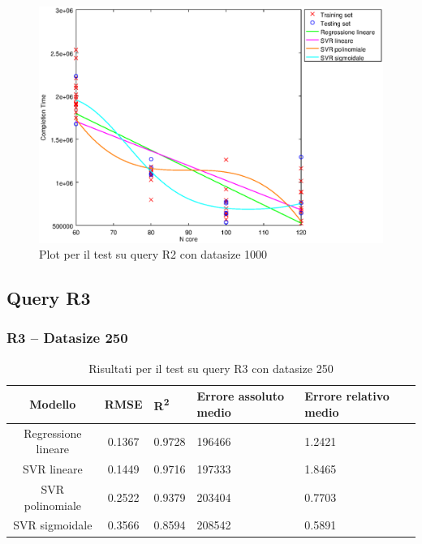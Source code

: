 \documentclass[a4paper,11pt]{article}
\begin{document}
\begin {figure}[hbtp]
\centering
\includegraphics[width=\textwidth]{output/R2_1000/plot_R2_1000.eps}
\caption {Plot per il test su query R2 con datasize 1000}
\end {figure}

\newpage
\subsection{Query R3}

\subsubsection{R3 -- Datasize 250}
\begin{table}[bhpt]
	\centering
	\begin{adjustbox}{center}
		\begin{tabular}{c | c M{1cm} M{2.5cm} M{2.5cm} M{1.8cm}}
			Modello & RMSE & R\textsuperscript{2} & Errore assoluto medio & Errore relativo medio \tabularnewline
			\hline
			Regressione lineare & 0.1367 & 0.9728 & 196466 & 1.2421 \\
			SVR lineare & 0.1449 & 0.9716 & 197333 & 1.8465 \\
			SVR polinomiale & 0.2522 & 0.9379 & 203404 & 0.7703 \\
			SVR sigmoidale & 0.3566 & 0.8594 & 208542 & 0.5891 \\
		\end{tabular}
	\end{adjustbox}
	\\
	\caption{Risultati per il test su query R3 con datasize 250}
	\label{table_R3_250}
\end{table}
\end{document}
